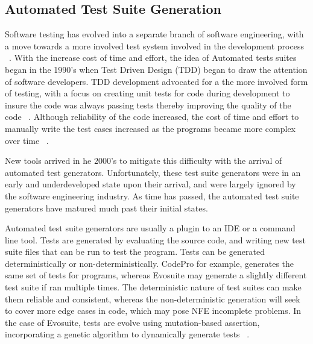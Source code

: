 \documentclass[conference]{IEEEtran}
\begin{document}
\subsection{Automated Test Suite Generation}
Software testing has evolved into a separate branch of software engineering, with a move towards a more involved test system involved in the development process ~\cite{Gelperin:1988:GST:62959.62965}. With the increase cost of time and effort, the idea of Automated tests suites began in the 1990's when Test Driven Design (TDD) began to draw the attention of software developers. TDD development advocated for a the more involved form of testing, with a focus on creating unit tests for code during development to insure the code was always passing tests thereby improving the quality of the code ~\cite{Canfora:2006:EAT:1159733.1159788}.  Although reliability of the code increased, the cost of time and effort to manually write the test cases increased as the programs became more complex over time ~\cite{clarke1998automated}. 

New tools arrived in he 2000's to mitigate this difficulty with the arrival of automated test generators. Unfortunately, these test suite generators were in an early and underdeveloped state upon their arrival, and were largely ignored by the software engineering industry. As time has passed, the automated test suite generators have matured much past their initial states.

Automated test suite generators are usually a plugin to an IDE or a command line tool. Tests are generated by evaluating the source code, and writing new test suite files that can be run to test the program.  Tests can be generated deterministically or non-deterministically. CodePro for example, generates the same set of tests for programs, whereas Evosuite may generate a slightly different test suite if ran multiple times. The deterministic nature of test suites can make them reliable and consistent, whereas the non-deterministic generation will seek to cover more edge cases in code, which may pose NFE incomplete problems. In the case of Evosuite, tests are evolve using mutation-based assertion, incorporating a genetic algorithm to dynamically generate tests ~\cite{Fraser:2011:EAT:2025113.2025179}. 

\end{document}
